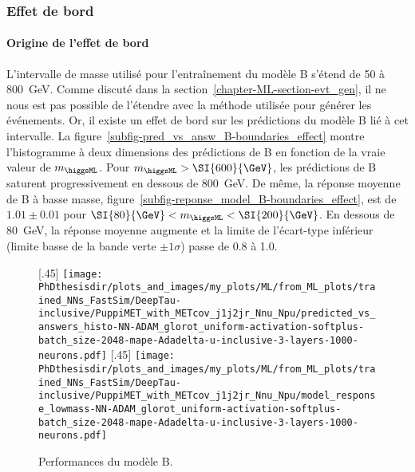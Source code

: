 \subsubsection{Effet de bord}
\paragraph{Origine de l'effet de bord}
L'intervalle de masse utilisé pour l'entraînement du modèle B
s'étend de \num{50} à \SI{800}{\GeV}.
Comme discuté dans la section~\ref{chapter-ML-section-evt_gen},
il ne nous est pas possible de l'étendre avec la méthode utilisée pour générer les événements.
Or, il existe un effet de bord sur les prédictions du modèle B lié à cet intervalle.
La figure~\ref{subfig-pred_vs_answ_B-boundaries_effect} montre l'histogramme à deux dimensions des prédictions de B en fonction de la vraie valeur de $m_{\higgsML}$.
Pour $m_{\higgsML}>\SI{600}{\GeV}$, les prédictions de B saturent progressivement en dessous de \SI{800}{\GeV}.
De même, la réponse moyenne de B à basse masse, figure~\ref{subfig-reponse_model_B-boundaries_effect},
est de $\num{1.01}\pm\num{0.01}$ pour $\SI{80}{\GeV}<m_{\higgsML}<\SI{200}{\GeV}$.
En dessous de \SI{80}{\GeV}, la réponse moyenne augmente
et
la limite de l'écart-type inférieur (limite basse de la bande verte $\pm1\sigma$) passe de \num{0.8} à \num{1.0}.
\begin{figure}[h]
\centering

[.45\textwidth]
{\texttt{[image: \\PhDthesisdir/plots\_and\_images/my\_plots/ML/from\_ML\_plots/trained\_NNs\_FastSim/DeepTau-inclusive/PuppiMET\_with\_METcov\_j1j2jr\_Nnu\_Npu/predicted\_vs\_answers\_histo-NN-ADAM\_glorot\_uniform-activation-softplus-batch\_size-2048-mape-Adadelta-u-inclusive-3-layers-1000-neurons.pdf]}\vspace{-.5\baselineskip}}
\hfill
{}[.45\textwidth]
{\texttt{[image: \\PhDthesisdir/plots\_and\_images/my\_plots/ML/from\_ML\_plots/trained\_NNs\_FastSim/DeepTau-inclusive/PuppiMET\_with\_METcov\_j1j2jr\_Nnu\_Npu/model\_response\_lowmass-NN-ADAM\_glorot\_uniform-activation-softplus-batch\_size-2048-mape-Adadelta-u-inclusive-3-layers-1000-neurons.pdf]}\vspace{-.5\baselineskip}}

\caption{Performances du modèle B.}
\label{fig-B-boundaries_effect}
\end{figure}
